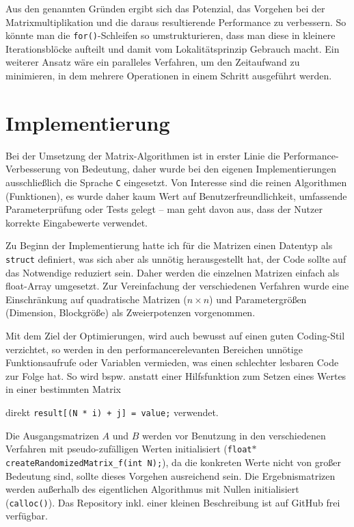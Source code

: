 \documentclass[a4paper,11pt]{scrartcl}
\newcommand{\bspw}{\mbox{bspw.}\xspace}
\newcommand{\inkl}{\mbox{inkl.}\xspace}
\begin{document}
Aus den genannten Gründen ergibt sich das Potenzial, das Vorgehen bei der Matrixmultiplikation
und die daraus resultierende Performance zu verbessern. So könnte man die \texttt{for()}-Schleifen so umstrukturieren, dass man diese in kleinere
Iterationsblöcke aufteilt und damit vom Lokalitätsprinzip Gebrauch macht. Ein weiterer Ansatz wäre
ein paralleles Verfahren, um den Zeitaufwand zu minimieren, in dem mehrere Operationen in einem
Schritt ausgeführt werden.

\section{Implementierung}
Bei der Umsetzung der Matrix-Algorithmen ist in erster Linie die Performance-Verbesserung 
von Bedeutung, daher wurde bei den eigenen Implementierungen ausschließlich die Sprache 
\texttt{C} eingesetzt. Von Interesse sind die reinen Algorithmen (Funktionen), es wurde daher
kaum Wert auf Benutzerfreundlichkeit, umfassende Parameterprüfung oder Tests gelegt --
man geht davon aus, dass der Nutzer korrekte Eingabewerte verwendet.\newline

Zu Beginn der Implementierung hatte ich für die Matrizen einen Datentyp als
\texttt{struct} definiert, was sich aber als unnötig herausgestellt hat, der
Code sollte auf das Notwendige reduziert sein. Daher werden die einzelnen 
Matrizen einfach als float-Array umgesetzt. Zur Vereinfachung der verschiedenen
Verfahren wurde eine Einschränkung auf quadratische Matrizen ($n \times n$) 
und Parametergrößen (Dimension, Blockgröße) als Zweierpotenzen vorgenommen.\newline

Mit dem Ziel der Optimierungen, wird auch bewusst auf einen guten Coding-Stil verzichtet,
so werden in den performancerelevanten Bereichen unnötige Funktionsaufrufe oder Variablen vermieden, was einen schlechter lesbaren Code zur Folge hat. So wird \bspw anstatt einer
Hilfsfunktion zum Setzen eines Wertes in einer bestimmten Matrix


direkt \texttt{result[(N * i) + j] = value;} verwendet.\newline

Die Ausgangsmatrizen $A$ und $B$
werden vor Benutzung in den verschiedenen Verfahren mit pseudo-zufälligen Werten initialisiert
(\texttt{float$*$ createRandomizedMatrix\_f(int N);}), da die konkreten Werte nicht von großer Bedeutung sind, sollte dieses Vorgehen ausreichend sein. Die Ergebnismatrizen werden außerhalb des eigentlichen
Algorithmus mit Nullen initialisiert (\texttt{calloc()}). Das Repository \inkl einer kleinen
Beschreibung ist auf GitHub \cite{ghub} frei verfügbar.
\end{document}
